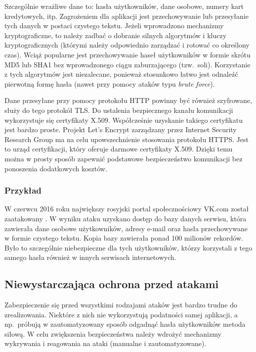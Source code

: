 \documentclass[11pt,a4paper,polish,thesis,oneside]{dcsbook}
\begin{document}
Szczególnie wrażliwe dane to: hasła użytkowników, dane osobowe, numery kart kredytowych, itp. Zagrożeniem dla aplikacji jest przechowywanie lub przesyłanie tych danych w postaci czystego tekstu. Jeżeli wprowadzono mechanizmy kryptograficzne, to należy zadbać o dobranie silnych algorytmów i kluczy kryptograficznych (którymi należy odpowiednio zarządzać i rotować co określony czas). Wciąż popularne jest przechowywanie haseł użytkowników w formie skrótu MD5 lub SHA1 bez wprowadzonego ciągu zaburzającego (tzw.~soli). Korzystanie z tych algorytmów jest niezalecane, ponieważ stosunkowo łatwo jest odnaleźć pierwotną formę hasła (nawet przy pomocy ataków typu \textit{brute force}). 

Dane przesyłane przy pomocy protokołu HTTP powinny być również szyfrowane, służy do tego protokół TLS. Do ustalenia bezpiecznego kanału komunikacji wykorzystuje się certyfikaty X.509. Współcześnie uzyskanie takiego certyfikatu jest bardzo proste. Projekt Let's Encrypt zarządzany przez Internet Security Research Group ma na celu upowszechnienie stosowania protokołu HTTPS. Jest to urząd certyfikacji, który oferuje darmowe certyfikaty X.509. Dzięki temu można w prosty sposób zapewnić podstawowe bezpieczeństwo komunikacji bez ponoszenia dodatkowych kosztów.

\subsubsection*{Przykład}
W czerwcu 2016 roku największy rosyjski portal społecznościowy VK.com został zaatakowany \cite{vk}. W wyniku ataku uzyskano dostęp do bazy danych serwisu, która zawierała dane osobowe użytkowników, adresy e-mail oraz hasła przechowywane w formie czystego tekstu. Kopia bazy zawierała ponad 100 milionów rekordów. Było to szczególnie niebezpieczne dla tych użytkowników, którzy korzystali z tego samego hasła również w innych serwisach internetowych. 


\subsection{Niewystarczająca ochrona przed atakami}
Zabezpieczenie się przed wszystkimi rodzajami ataków jest bardzo trudne do zrealizowania. Niektóre z nich nie wykorzystują podatności samej aplikacji, a np.~próbują w zautomatyzowany sposób odgadnąć hasła użytkowników metoda siłową. W celu zwiększenia bezpieczeństwa należy wdrożyć mechanizmy wykrywania i reagowania na ataki (manualne i zautomatyzowane).
\end{document}
